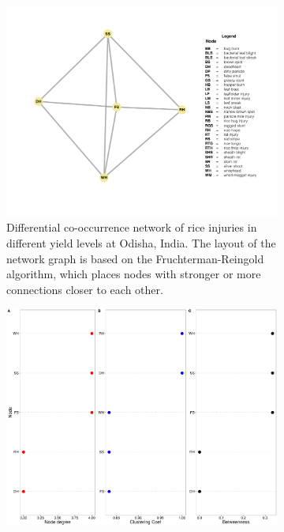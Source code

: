 \begin{figure}
    \centering
    \begin{subfigure}[b]{1\textwidth}
        \includegraphics[width = 1\textwidth]{figures/difyieldOD/difyieldOD.pdf}
        \caption[Differential co-occurrence network of rice injuries in different yield levels at Odisha, India.]{Differential co-occurrence network of rice injuries in different yield levels at Odisha, India. The layout of the network graph is based on the Fruchterman-Reingold algorithm, which places nodes with stronger or more connections closer to each other.}
        \label{fig:difyieldnetwork_OD}
    \end{subfigure}
    \begin{subfigure}[b]{1\textwidth}
        \includegraphics[width = 1\textwidth]{figures/yield_dif_nodepropOdisha/yield_dif_nodepropOdisha.pdf}

\end{subfigure}
\end{figure}
